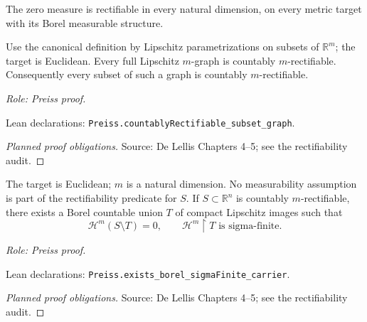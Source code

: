 \begin{lemma}
\label{lem:zero-measure}








The zero measure is rectifiable in every natural dimension, on every metric target with its Borel measurable structure.
\end{lemma}

\begin{lemma}
\label{lem:graph-rectifiable}








Use the canonical definition by Lipschitz parametrizations on subsets of \(\mathbb R^m\); the target is Euclidean.
Every full Lipschitz \(m\)-graph is countably \(m\)-rectifiable. Consequently every subset of such a graph is countably \(m\)-rectifiable.
\par\emph{Role: Preiss proof.}
\par Lean declarations: \texttt{Preiss.countablyRectifiable\_subset\_graph}.
\end{lemma}
\begin{proof}[Planned proof obligations]

\par Source: De Lellis Chapters 4--5; see the rectifiability audit.
\end{proof}

\begin{lemma}
\label{lem:borel-carrier}







The target is Euclidean; \(m\) is a natural dimension. No measurability assumption is part of the rectifiability predicate for \(S\).
If \(S\subset\mathbb R^n\) is countably \(m\)-rectifiable, there exists a Borel countable union \(T\) of compact Lipschitz images such that
\[
 \mathcal H^m(S\setminus T)=0,\qquad
 \mathcal H^m\!\restriction T\text{ is sigma-finite}.
\]
\par\emph{Role: Preiss proof.}
\par Lean declarations: \texttt{Preiss.exists\_borel\_sigmaFinite\_carrier}.
\end{lemma}
\begin{proof}[Planned proof obligations]

\par Source: De Lellis Chapters 4--5; see the rectifiability audit.
\end{proof}

